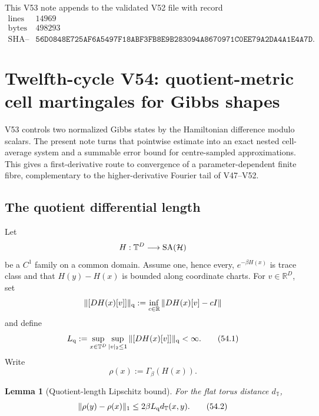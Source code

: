 \documentclass[11pt]{article}
\newtheorem{lemma}[theorem]{Lemma}
\theoremstyle{remark}
\begin{document}
This V53 note appends to the validated V52 file with record
\[
\begin{array}{c|c}
\text{lines}&14969\\
\text{bytes}&498293\\
\text{SHA--256}&
\texttt{56D0848E725AF6A5497F18ABF3FB8E9B283094A8670971C0EE79A2DA4A1E4A7D}.
\end{array}
\]


\section{Twelfth-cycle V54: quotient-metric cell martingales for Gibbs
shapes}
\label{sec:v12v54}

V53 controls two normalized Gibbs states by the Hamiltonian
difference modulo scalars.  The present note turns that pointwise
estimate into an exact nested cell-average system and a summable
error bound for centre-sampled approximations.  This gives a
first-derivative route to convergence of a parameter-dependent
finite fibre, complementary to the higher-derivative Fourier tail
of V47--V52.

\subsection{The quotient differential length}

Let
\[
 H:{\mathbb T}^D\longrightarrow{\rm SA}({\cal H})
\]
be a \(C^1\) family on a common domain.  Assume one, hence every,
\(e^{-\beta H(x)}\) is trace class and that
\(H(y)-H(x)\) is bounded along coordinate charts.  For
\(v\in\mathbb R^D\), set
\[
 \|[DH(x)[v]]\|_{\rm q}
 :=
 \inf_{c\in\mathbb R}\|DH(x)[v]-cI\|
\]
and define
\begin{equation}
 L_{\rm q}
 :=
 \sup_{x\in{\mathbb T}^D}
 \sup_{|v|_2\leq1}
 \|[DH(x)[v]]\|_{\rm q}<\infty.                  \tag{54.1}
\end{equation}
Write
\[
 \rho(x):=\Gamma_\beta(H(x)).
\]

\begin{lemma}[Quotient-length Lipschitz bound]
\label{lem:v12v54-length}
For the flat torus distance \(d_{\mathbb T}\),
\begin{equation}
 \|\rho(y)-\rho(x)\|_1
 \leq2\beta L_{\rm q}d_{\mathbb T}(x,y).
                                                            \tag{54.2}
\end{equation}
\end{lemma}
\end{document}
